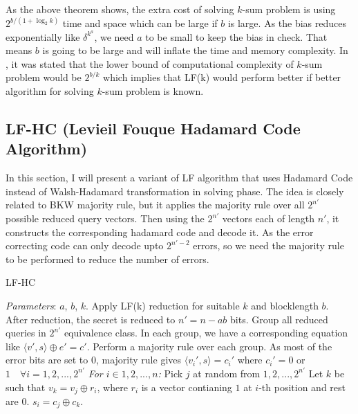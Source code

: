 \documentclass{article}
\begin{document}
   As the above theorem shows, the extra cost of solving $k$-sum problem is using $2^{b/(1+\log_2k)}$ time and space which can be large if $b$ is large. As the bias reduces exponentially like $\delta^{k^{a}}$, we need $a$ to be small to keep the bias in check. That means $b$ is going to be large and will inflate the time and memory complexity. In \cite{Ksum}, it was stated that the lower bound of computational complexity of $k$-sum problem would be $2^{b/k}$ which implies that LF(k) would perform better if better algorithm for solving $k$-sum problem is known.
 
 \subsection[3.2]{LF-HC (Levieil Fouque Hadamard Code Algorithm)}
 In this section, I will present a variant of LF algorithm that uses Hadamard Code instead of Walsh-Hadamard transformation in solving phase. The idea is closely related to BKW \cite{BKW} majority rule, but it applies the majority rule over all $2^{n'}$ possible reduced query vectors. Then using the $2^{n'}$ vectors each of length $n'$, it constructs the corresponding hadamard code and decode it. As the error correcting code can only decode upto $2^{n'-2}$ errors, so we need the majority rule to be performed to reduce the number of errors.\\
 
 \begin{algorithm}
 	\caption{LF-HC}\label{LFHC}
 	\begin{algorithmic}[1]
 	   \State \emph{Parameters}: $a$, $b$, $k$.
 	   \State Apply LF(k) reduction for suitable $k$ and blocklength $b$.
 	   \State After reduction, the secret is reduced to $n'=n-ab$ bits.
 	   \State Group all reduced queries in $2^{n'}$ equivalence class. In each group, we have a corresponding equation like $\langle v',s\rangle\oplus e'=c'$.
 	   \State Perform a majority rule over each group. As most of the error bits are set to $0$, majority rule gives $\langle v_i',s\rangle=c_i'$ where $c_i'=0$ or $1\quad\forall i=1,2,...,2^{n'}$
 	   \State \emph{For $i \in {1,2,...,n}$:}
 	   \State \qquad Pick $j$ at random from $1,2,...,2^{n'}$
 	   \State \qquad Let $k$ be such that $v_k=v_j\oplus r_i$, where $r_i$ is a vector contianing $1$ at $i$-th position and rest are $0$.
 	   \State \qquad $s_i=c_j\oplus c_k$.
 	\end{algorithmic}
 \end{algorithm}
 
\end{document}
